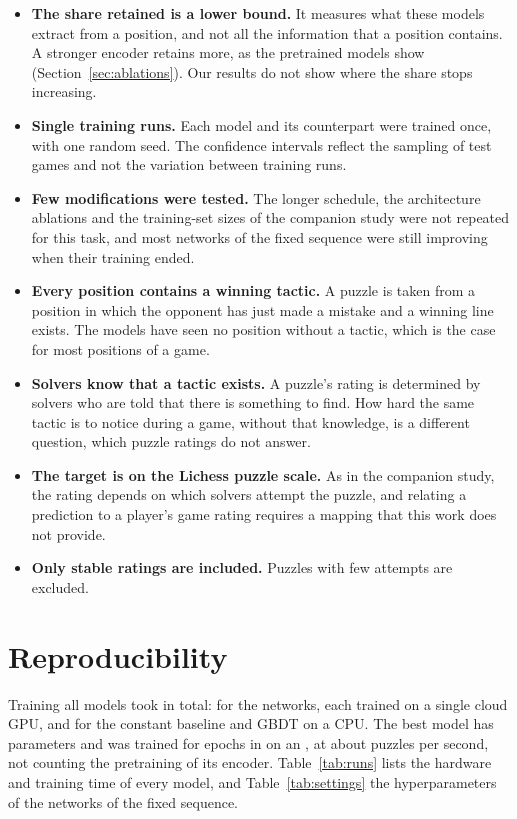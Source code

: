 \documentclass[11pt]{article}
\begin{document}
\begin{itemize}
\item \textbf{The share retained is a lower bound.} It measures what these
models extract from a position, and not all the information that a position
contains. A stronger encoder retains more, as the pretrained models show
(Section~\ref{sec:ablations}). Our results do not show where the share stops
increasing.
\item \textbf{Single training runs.} Each model and its counterpart were
trained once, with one random seed. The confidence intervals reflect the
sampling of test games and not the variation between training runs.
\item \textbf{Few modifications were tested.} The longer schedule, the
architecture ablations and the training-set sizes of the companion study were
not repeated for this task, and most networks of the fixed sequence were
still improving when their training ended.
\item \textbf{Every position contains a winning tactic.} A puzzle is taken
from a position in which the opponent has just made a mistake and a winning
line exists. The models have seen no position without a tactic, which is the
case for most positions of a game.
\item \textbf{Solvers know that a tactic exists.} A puzzle's rating is
determined by solvers who are told that there is something to find. How
hard the same tactic is to notice during a game, without that knowledge, is a
different question, which puzzle ratings do not answer.
\item \textbf{The target is on the Lichess puzzle scale.} As in the
companion study, the rating depends on which solvers attempt the puzzle, and
relating a prediction to a player's game rating requires a mapping that this
work does not provide.
\item \textbf{Only stable ratings are included.} Puzzles with few attempts
are excluded.
\end{itemize}

\section{Reproducibility}
\label{sec:cost}

Training all  models took  in total:
 for the networks, each trained on a single cloud
GPU, and  for the constant baseline and GBDT on a CPU.
The best model has  parameters and was trained for
 epochs in  on an , at
about  puzzles per second, not counting the pretraining
of its encoder. Table~\ref{tab:runs} lists
the hardware and training time of every model, and
Table~\ref{tab:settings} the hyperparameters of the networks of the fixed
sequence.
\end{document}
